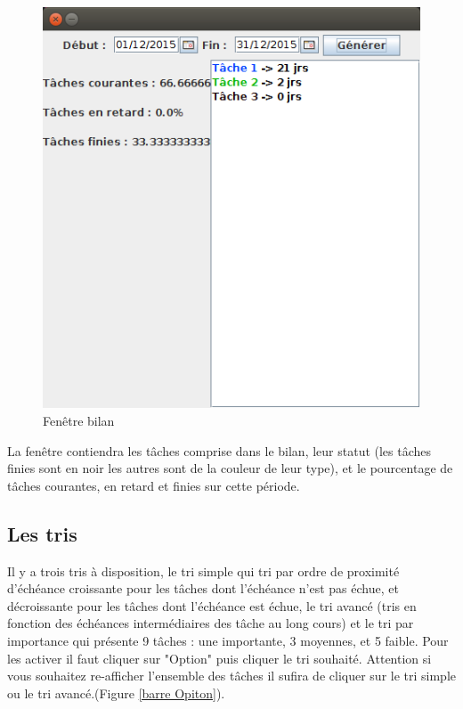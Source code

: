 \documentclass{article}
\begin{document}
\begin{figure}
	\centering
	\includegraphics[scale=0.5]{images/CaptureDisplayBilan.png}
	\caption{Fenêtre bilan}
	\label{bilan}
\end{figure}

La fenêtre contiendra les tâches comprise dans le bilan, leur statut (les tâches finies sont en noir les autres sont de la couleur de leur type), et le pourcentage de tâches courantes, en retard et finies sur cette période.

\subsection{Les tris}

Il y a trois tris à disposition, le tri simple qui tri par ordre de proximité
d'échéance croissante pour les tâches dont l'échéance n'est pas échue, et décroissante
pour les tâches dont l'échéance est échue, le tri avancé (tris en fonction des échéances intermédiaires des tâche au long cours) et le tri par importance qui présente 9 tâches : une importante, 3 moyennes, et 5 faible. Pour les activer il faut cliquer sur "Option" puis cliquer le tri souhaité. Attention si vous souhaitez re-afficher l'ensemble des tâches il sufira de cliquer sur le tri simple ou le tri avancé.(Figure \ref{barre Opiton}).
\end{document}
